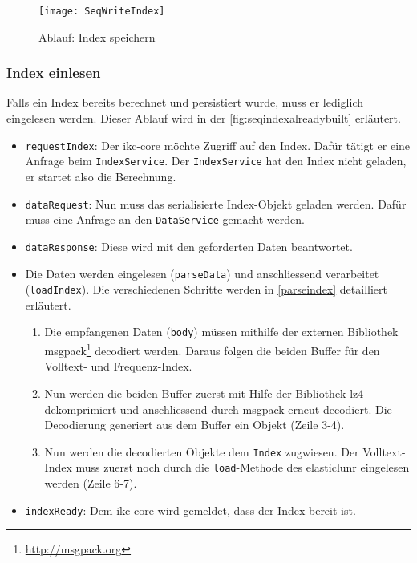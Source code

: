     \begin{figure}[H]
    \centering
    \texttt{[image: SeqWriteIndex]}
    \caption{Ablauf: Index speichern}
    \label{fig:seqwriteindex}
    \end{figure}

    

    
\subsubsection{Index einlesen}



Falls ein Index bereits berechnet und persistiert wurde, muss er lediglich eingelesen werden. Dieser Ablauf wird in der \autoref{fig:seqindexalreadybuilt} erläutert. 
\begin{itemize}
    \item \texttt{requestIndex}: Der \gls{ikc-core} möchte Zugriff auf den Index. Dafür tätigt er eine Anfrage beim \texttt{IndexService}. Der \texttt{IndexService} hat den Index nicht geladen, er startet also die Berechnung.
    \item \texttt{dataRequest}: Nun muss das serialisierte Index-Objekt geladen werden. Dafür muss eine Anfrage an den \texttt{DataService} gemacht werden.
    \item \texttt{dataResponse}: Diese wird mit den geforderten Daten beantwortet.
    \item Die Daten werden eingelesen (\texttt{parseData}) und anschliessend verarbeitet (\texttt{loadIndex}). Die verschiedenen Schritte werden in \autoref{parseindex} detailliert erläutert.
    \begin{enumerate}
        \item Die empfangenen Daten (\texttt{body}) müssen mithilfe der externen Bibliothek \gls{msgpack}\footnote{\url{http://msgpack.org}} decodiert werden. Daraus folgen die beiden \gls{Buffer} für den Volltext- und Frequenz-Index.
        \item Nun werden die beiden \gls{Buffer} zuerst mit Hilfe der Bibliothek \gls{lz4} dekomprimiert und anschliessend durch \gls{msgpack} erneut decodiert. Die Decodierung generiert aus dem Buffer ein Objekt (Zeile 3-4).
        \item Nun werden die decodierten Objekte dem \texttt{Index} zugwiesen. Der Volltext-Index muss zuerst noch durch die \texttt{load}-Methode des \gls{elasticlunr} eingelesen werden (Zeile 6-7).
    \end{enumerate}
    \item \texttt{indexReady}: Dem \gls{ikc-core} wird gemeldet, dass der Index bereit ist.
\end{itemize}

